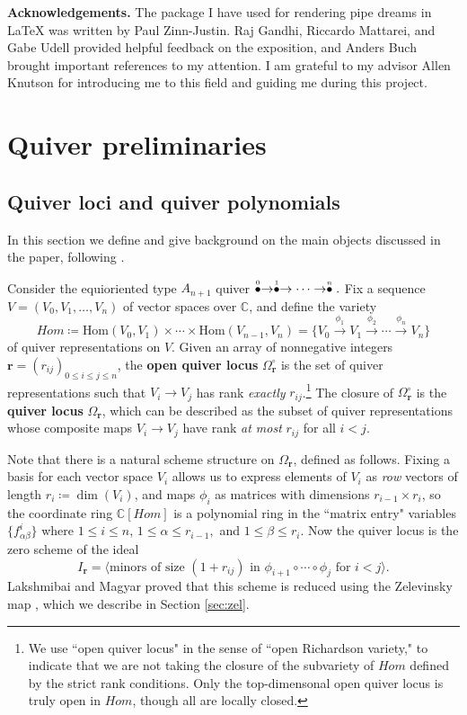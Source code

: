 \documentclass[reqno]{amsart}
\newcommand{\C}{\mathbb{C}}
\def\Hom{\textrm{Hom}}
\numberwithin{equation}{section}
\theoremstyle{definition}
\theoremstyle{remark}
\begin{document}
\noindent\textbf{Acknowledgements.} The package I have used for rendering pipe dreams in LaTeX was written by Paul Zinn-Justin. Raj Gandhi, Riccardo Mattarei, and Gabe Udell provided helpful feedback on the exposition, and Anders Buch brought important references to my attention. I am grateful to my advisor Allen Knutson for introducing me to this field and guiding me during this project.

\section{Quiver preliminaries}\label{sec:prelim}
\subsection{Quiver loci and quiver polynomials}\label{subsec:qdefs}
In this section we define and give background on the main objects discussed in the paper, following \cite{kms06}. 

Consider the equioriented type $A_{n+1}$ quiver $\mathrel{\overset{\makebox[0pt]{\mbox{\normalfont\tiny 0}}}{\bullet}} \to \mathrel{\overset{\makebox[0pt]{\mbox{\normalfont\tiny 1}}}{\bullet}} \to  \cdots \to \mathrel{\overset{\makebox[0pt]{\mbox{\tiny $n$}}}{\bullet}}.$
Fix a sequence $V=(V_0,V_1,\dots,V_n)$ of vector spaces over $\C$, and define the variety
\[Hom \coloneqq \Hom(V_0,V_1) \times \cdots \times \Hom(V_{n-1},V_n) =\{V_0 \xrightarrow{\phi_1} V_1 \xrightarrow{\phi_2} \cdots \xrightarrow{\phi_n} V_n\}\] 
of quiver representations on $V$. Given an array of nonnegative integers $\mathbf{r}=(r_{ij})_{0 \leq i\leq j \leq n}$, the \textbf{open quiver locus} $\Omega_{\mathbf{r}}^\circ$ is the set of quiver representations such that $V_i \to V_j$ has rank \textit{exactly} $r_{ij}$.\footnote{We use ``open quiver locus" in the sense of ``open Richardson variety," to indicate that we are not taking the closure of the subvariety of $Hom$ defined by the strict rank conditions. Only the top-dimensonal open quiver locus is truly open in $Hom$, though all are locally closed.} The closure of $\Omega_{\mathbf{r}}^\circ$ is the \textbf{quiver locus} $\Omega_{\mathbf{r}}$, which can be described as the subset of quiver representations whose composite maps $V_i \to V_j$ have rank \textit{at most} $r_{ij}$ for all $i<j$.

Note that there is a natural scheme structure on $\Omega_{\mathbf{r}}$, defined as follows. Fixing a basis for each vector space $V_i$ allows us to express elements of $V_i$ as \textit{row} vectors of length $r_i \coloneqq \dim(V_i)$, and maps $\phi_i$ as matrices with dimensions $r_{i-1} \times r_i$, so the coordinate ring $\C[Hom]$ is a polynomial ring in the ``matrix entry" variables $\{f_{\alpha \beta}^i\}$ where $1\leq i \leq n$, $1 \leq \alpha \leq r_{i-1},$ and $1 \leq \beta \leq r_{i}$. Now the quiver locus is the zero scheme of the ideal
\[I_{\mathbf{r}}=\langle \textrm{minors of size }(1+r_{ij})\textrm{ in } \phi_{i+1}\circ \cdots \circ \phi_j \textrm{ for } i<j \rangle.\]
Lakshmibai and Magyar \cite{lm98} proved that this scheme is reduced using the Zelevinsky map \cite{Zel85}, which we describe in Section \ref{sec:zel}.
\end{document}
